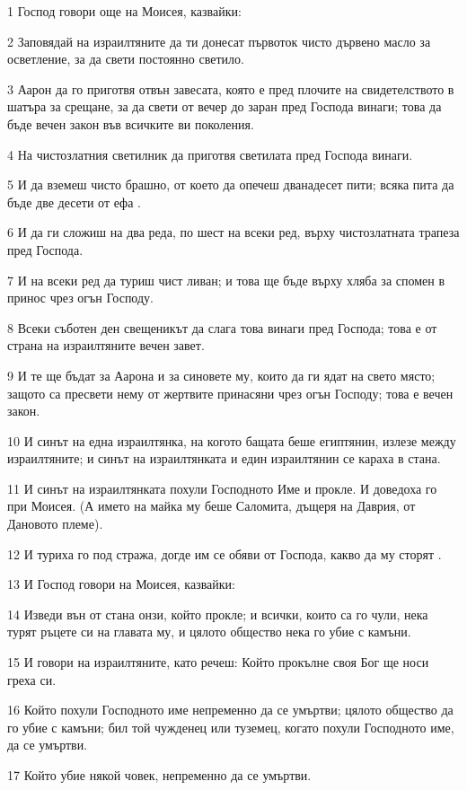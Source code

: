 \par 1 Господ говори още на Моисея, казвайки:
\par 2 Заповядай на израилтяните да ти донесат първоток чисто дървено масло за осветление, за да свети постоянно светило.
\par 3 Аарон да го приготвя отвън завесата, която е пред плочите на свидетелството в шатъра за срещане, за да свети от вечер до заран пред Господа винаги; това да бъде вечен закон във всичките ви поколения.
\par 4 На чистозлатния светилник да приготвя светилата пред Господа винаги.
\par 5 И да вземеш чисто брашно, от което да опечеш дванадесет пити; всяка пита да бъде две десети от ефа .
\par 6 И да ги сложиш на два реда, по шест на всеки ред, върху чистозлатната трапеза пред Господа.
\par 7 И на всеки ред да туриш чист ливан; и това ще бъде върху хляба за спомен в принос чрез огън Господу.
\par 8 Всеки съботен ден свещеникът да слага това винаги пред Господа; това е от страна на израилтяните вечен завет.
\par 9 И те ще бъдат за Аарона и за синовете му, които да ги ядат на свето място; защото са пресвети нему от жертвите принасяни чрез огън Господу; това е вечен закон.
\par 10 И синът на една израилтянка, на когото бащата беше египтянин, излезе между израилтяните; и синът на израилтянката и един израилтянин се караха в стана.
\par 11 И синът на израилтянката похули Господното Име и прокле. И доведоха го при Моисея. (А името на майка му беше Саломита, дъщеря на Даврия, от Дановото племе).
\par 12 И туриха го под стража, догде им се обяви от Господа, какво да му сторят .
\par 13 И Господ говори на Моисея, казвайки:
\par 14 Изведи вън от стана онзи, който прокле; и всички, които са го чули, нека турят ръцете си на главата му, и цялото общество нека го убие с камъни.
\par 15 И говори на израилтяните, като речеш: Който прокълне своя Бог ще носи греха си.
\par 16 Който похули Господното име непременно да се умъртви; цялото общество да го убие с камъни; бил той чужденец или туземец, когато похули Господното име, да се умъртви.
\par 17 Който убие някой човек, непременно да се умъртви.
